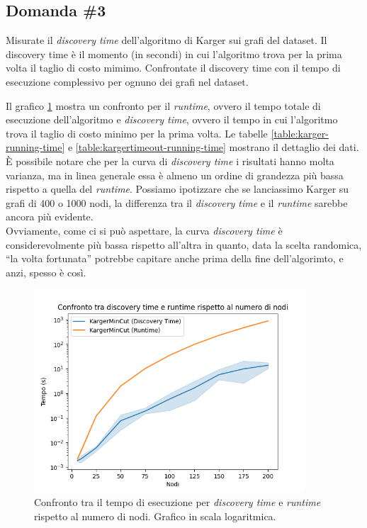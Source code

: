 \subsection{Domanda \#3}
\label{sec:question-3}

\begin{displayquote}
Misurate il \textit{discovery time} dell'algoritmo di Karger sui grafi
del dataset. Il discovery time è il momento (in secondi) in cui
l'algoritmo trova per la prima volta il taglio di costo mimimo.
Confrontate il discovery time con il tempo di esecuzione complessivo
per ognuno dei grafi nel dataset.
\end{displayquote}

\noindent Il grafico \ref{fig:karger-discovery-vs-program-time-chart}
mostra un confronto per il \emph{runtime}, ovvero il tempo totale di
esecuzione dell'algoritmo e \emph{discovery time}, ovvero il tempo in
cui l'algoritmo trova il taglio di costo minimo per la prima volta.
Le tabelle \ref{table:karger-running-time} e
\ref{table:kargertimeout-running-time} mostrano il dettaglio dei
dati. \\

\noindent È possibile notare che per la curva di \emph{discovery time}
i risultati hanno molta varianza, ma in linea generale essa è almeno un ordine di grandezza più bassa rispetto a quella del \emph{runtime}. Possiamo ipotizzare che se lanciassimo Karger su grafi di 400 o 1000 nodi, la differenza tra il \emph{discovery time} e il \emph{runtime} sarebbe ancora più evidente. \\

\noindent Ovviamente, come ci si può aspettare, la curva
\emph{discovery time} è considerevolmente più bassa rispetto all'altra
in quanto, data la scelta randomica, ``la volta fortunata'' potrebbe
capitare anche prima della fine dell'algorimto, e anzi, spesso è così.

\begin{figure}[H]
    \centering

    \includegraphics[width=0.9\textwidth]{./images/Confronto_tra_discovery_time_e_runtime_rispetto_al_numero_di_nodi.png}

    \caption{Confronto tra il tempo di esecuzione per \emph{discovery time} e \emph{runtime} rispetto al numero di nodi. Grafico in scala logaritmica.}
    \label{fig:karger-discovery-vs-program-time-chart}
\end{figure}

